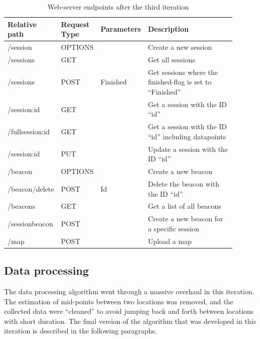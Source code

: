 \documentclass[../Main/thesis.tex]{subfiles}
\begin{document}
\begin{table}[h]
\caption{Web-server endpoints after the third iteration}
\begin{tabular}{|p{0.2\linewidth}|p{0.15\linewidth}|p{0.15\linewidth}|p{0.4\linewidth}|}
\hline
\textbf{Relative path} & \textbf{Request Type} & \textbf{Parameters} & \textbf{Description}                                        \\ \hline
/session               & OPTIONS               &                     & Create a new session                                        \\ \hline
/sessions              & GET                   &                     & Get all sessions                                            \\ \hline
/sessions              & POST                  & Finished            & Get sessions where the finished-flag is set to ``Finished'' \\ \hline
/session:id            & GET                   &                     & Get a session with the ID ``id''                            \\ \hline
/fullsession:id        & GET                   &                     & Get a session with the ID ``id'' including datapoints       \\ \hline
/session:id            & PUT                   &                     & Update a session with the ID ``id''                         \\ \hline
/beacon                & OPTIONS               &                     & Create a new beacon                                         \\ \hline
/beacon/delete         & POST                  & Id                  & Delete the beacon with the ID ``id''                        \\ \hline
/beacons               & GET                   &                     & Get a list of all beacons                                   \\ \hline
/sessionbeacon         & POST                  &                     & Create a new beacon for a specific session                  \\ \hline
/map                   & POST                  &                     & Upload a map                                                \\ \hline
\end{tabular}
\label{tab:endpoints-2}
\end{table}

\subsection{Data processing}
\label{sec:data-processing-2}
The data processing algorithm went through a massive overhaul in this iteration.
The estimation of mid-points between two locations was removed, and the collected data were ``cleaned'' to avoid jumping back and forth between locations with short duration. 
The final version of the algorithm that was developed in this iteration is described in the following paragraphs.
\end{document}
